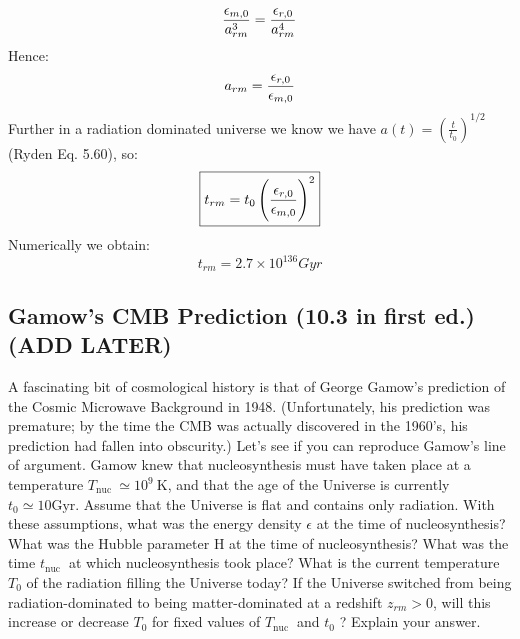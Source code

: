 \begin{equation}
    \frac{\epsilon_{m, 0}}{a_{rm}^3} = \frac{\epsilon_{r, 0}}{a_{rm}^4}
\end{equation}
Hence:
\begin{equation}
    a_{rm} = \frac{\epsilon_{r, 0}}{\epsilon_{m, 0}}
\end{equation}
Further in a radiation dominated universe we know we have $a(t) = \left(\frac{t}{t_0}\right)^{1/2}$ (Ryden Eq. 5.60), so:
\begin{equation}
    \boxed{t_{rm} = t_0 \left(\frac{\epsilon_{r, 0}}{\epsilon_{m, 0}}\right)^2}
\end{equation}
Numerically we obtain:
\begin{equation}
    \boxed{t_{rm} = 2.7 \times 10^{136}\si{Gyr}}
\end{equation}

\subsection*{Gamow's CMB Prediction (10.3 in first ed.) (ADD LATER)}
\begin{tcolorbox}
    A fascinating bit of cosmological history is that of George Gamow's prediction of the Cosmic Microwave Background in 1948. (Unfortunately, his prediction was premature; by the time the CMB was actually discovered in the 1960's, his prediction had fallen into obscurity.) Let's see if you can reproduce Gamow's line of argument. Gamow knew that nucleosynthesis must have taken place at a temperature $T_{\text {nuc }} \simeq 10^{9} \mathrm{~K}$, and that the age of the Universe is currently $t_{0} \simeq 10 \mathrm{Gyr}$. Assume that the Universe is flat and contains only radiation. With these assumptions, what was the energy density $\epsilon$ at the time of nucleosynthesis? What was the Hubble parameter $\mathrm{H}$ at the time of nucleosynthesis? What was the time $t_{\text {nuc }}$ at which nucleosynthesis took place? What is the current temperature $T_{0}$ of the radiation filling the Universe today? If the Universe switched from being radiation-dominated to being matter-dominated at a redshift $z_{r m}>0$, will this increase or decrease $T_{0}$ for fixed values of $T_{\text {nuc }}$ and $t_{0}$ ? Explain your answer.
\end{tcolorbox}